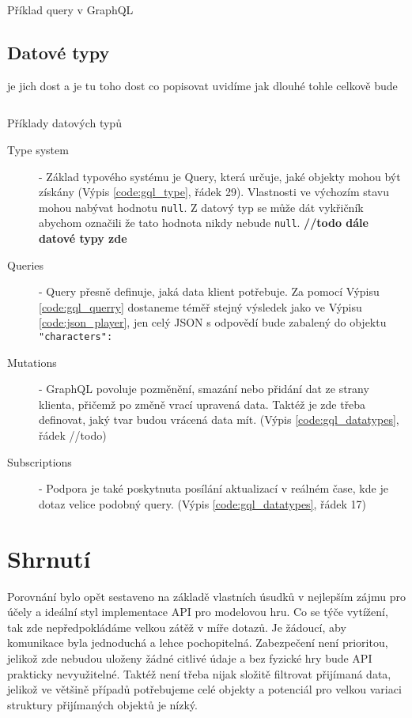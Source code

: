 \begin{listing}[ht!]
    \inputminted[]{graphql}{resources/code//standards/playerquery.gql}
    \caption{Příklad query v GraphQL}
    \label{code:gql_querry}
\end{listing}


\subsection{Datové typy}
je jich dost a je tu toho dost co popisovat
uvidíme jak dlouhé tohle celkově bude


\begin{listing}[ht]
    \inputminted[]{graphql}{resources/code/standards/types.example.gql}
    \caption{Příklady datových typů}
    \label{code:gql_datatypes}
\end{listing}

\begin{description}
    \item[Type system] - Základ typového systému je Query, která určuje, jaké objekty mohou být získány (Výpis \ref{code:gql_type}, řádek 29). Vlastnosti ve výchozím stavu mohou nabývat hodnotu \texttt{null}. Z datový typ se může dát vykřičník abychom označili že tato hodnota nikdy nebude \texttt{null}. \textbf{//todo dále datové typy zde}
    \item[Queries] - Query přesně definuje, jaká data klient potřebuje. Za pomocí Výpisu \ref{code:gql_querry} dostaneme téměř stejný výsledek jako ve Výpisu \ref{code:json_player}, jen celý JSON s odpovědí bude zabalený do objektu \texttt{"characters": {}}
    \item[Mutations] - GraphQL povoluje pozměnění, smazání nebo přidání dat ze strany klienta, přičemž po změně vrací upravená data. Taktéž je zde třeba definovat, jaký tvar budou vrácená data mít. (Výpis \ref{code:gql_datatypes}, řádek //todo)
    \item[Subscriptions] - Podpora je také poskytnuta posílání aktualizací v reálném čase, kde je dotaz velice podobný query. (Výpis \ref{code:gql_datatypes}, řádek 17)
\end{description}


\section{Shrnutí}
Porovnání bylo opět sestaveno na základě vlastních úsudků v nejlepším zájmu pro účely a ideální styl implementace API pro modelovou hru. Co se týče vytížení, tak zde nepředpokládáme velkou zátěž v míře dotazů. Je žádoucí, aby komunikace byla jednoduchá a lehce pochopitelná. Zabezpečení není prioritou, jelikož zde nebudou uloženy žádné citlivé údaje a bez fyzické hry bude API prakticky nevyužitelné. Taktéž není třeba nijak složitě filtrovat přijímaná data, jelikož ve většině případů potřebujeme celé objekty a potenciál pro velkou variaci struktury přijímaných objektů je nízký.

